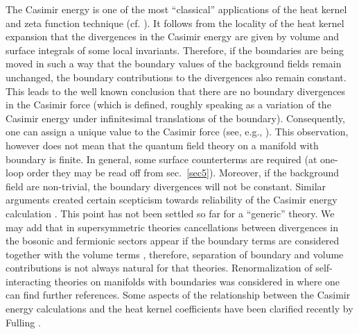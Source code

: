 The Casimir energy is one of the most ``classical'' applications
of the heat kernel and zeta function technique (cf. 
\cite{Blau:1988kv}). It follows 
from the locality of the heat kernel expansion that the divergences
in the Casimir energy are given by volume and surface integrals
of some local invariants. Therefore, if the boundaries are being
moved in such a way that the boundary values of the background fields 
remain unchanged, the boundary contributions
to the divergences also remain constant. This leads to the well
known conclusion \cite{Bordag:2001qi} that there are no boundary
divergences in the Casimir force (which is defined, roughly speaking
as a variation of the Casimir energy under infinitesimal translations
of the boundary). Consequently, one can assign a unique value to
the Casimir force (see, e.g., \cite{Milton:2002vm}). This observation,
however does not mean that the quantum field theory on a manifold
with boundary is finite. In general, some surface counterterms
are required (at one-loop order they may be read off from 
sec.\ \ref{sec5}). Moreover, if the background field are non-trivial,
the boundary divergences will not be constant. Similar arguments
created certain scepticism towards reliability of the Casimir energy
calculation \cite{Graham:2002xq}. This point has not been settled
so far for a ``generic'' theory. We may add that in supersymmetric 
theories cancellations between divergences in the bosonic and
fermionic sectors appear if the boundary terms are considered
together with the volume terms \cite{Bordag:2002dg}, therefore,
separation of boundary and volume contributions is not always natural
for that theories. Renormalization of self-interacting theories
on manifolds with boundaries was considered in 
\cite{Symanzik:1981wd,Odintsov:1990ny,
McAvity:1993fq,Wiesendanger:1994mw,Barvinsky:1996dp}
where one can find further references. Some aspects of the
relationship between the Casimir energy calculations and the
heat kernel coefficients have been clarified recently by
Fulling \cite{Fulling:2003zx}.

